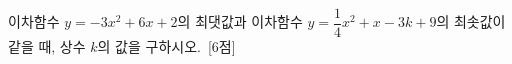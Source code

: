 이차함수 $y=-3x^2+6x+2$의 최댓값과 이차함수 $y=\dfrac{1}{4}x^2+x-3k+9$의 최솟값이 같을 때, 상수 $k$의 값을 구하시오.~\mbox{\mbox{[6점]}}
